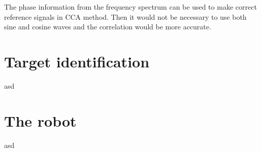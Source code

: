 The phase information from the frequency spectrum can be used to make correct reference signals in \gls{CCA} method. Then it would not be necessary to use both sine and cosine waves and the correlation would be more accurate.

\section{Target identification}
asd
\section{The robot}
asd